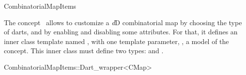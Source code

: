 \ccRefPageBegin

\begin{ccRefConcept}{CombinatorialMapItems}

\ccDefinition
  
The concept \ccRefName\ allows to customize a \emph{d}D combinatorial map
by choosing the type of darts, and by enabling and disabling some
attributes.  For that, it defines an inner class template named
, with one template parameter, , a model
of the  concept. This inner class must define
two types:  and .




\begin{ccClass}{CombinatorialMapItems::Dart_wrapper<CMap>}



\end{ccClass}
\end{ccRefConcept}
